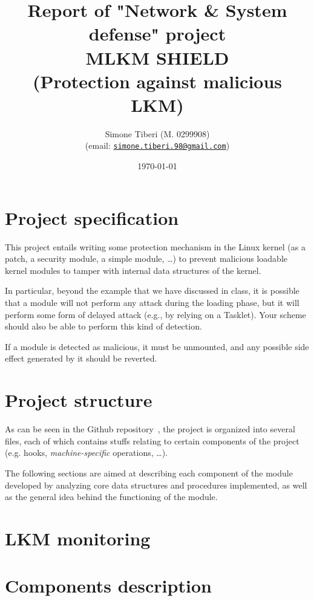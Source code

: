 \documentclass{article}
\title{\small Report of "Network \& System defense" project \\
\Huge \textbf{MLKM SHIELD}\\
\Large (Protection against malicious LKM)}
\author{Simone Tiberi (M. 0299908)\\%
(email: \texttt{\href{mailto:simone.tiberi.98@gmail.com}{simone.tiberi.98@gmail.com}})}
\date{\today}
\begin{document}
\maketitle

\begin{multicols}{2}
	\section{Project specification}
	This project entails writing some protection mechanism in the Linux kernel (as a patch, a security
	module, a simple module, \dots) to prevent malicious loadable kernel modules to tamper with
	internal data structures of the kernel.

	In particular, beyond the example that we have discussed in class, it is possible that a module will
	not perform any attack during the loading phase, but it will perform some form of delayed attack
	(e.g., by relying on a Tasklet). Your scheme should also be able to perform this kind of detection.

	If a module is detected as malicious, it must be unmounted, and any possible side effect
	generated by it should be reverted.

	\section{Project structure}
	As can be seen in the Github repository~\cite{github:repo}, the project is organized into several 
	files, each of which contains stuffs relating to certain components of the project (e.g. hooks, \textit{machine-specific} operations, \dots).

	The following sections are aimed at describing each component of the module developed by analyzing
	core data structures and procedures implemented, as well as the general idea behind the functioning 
	of the module.

	\section{LKM monitoring}
	\section{Components description}

	
	
\end{multicols}
\end{document}
